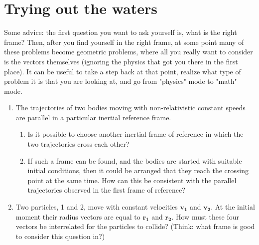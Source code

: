\documentclass{article}
\begin{document}
\section{Trying out the waters}
Some advice: the first question you want to ask yourself is, what is the right frame? Then, after you find yourself in the right frame, at some point many of these problems become geometric problems, where all you really want to consider is the vectors themselves (ignoring the physics that got you there in the first place). It can be useful to take a step back at that point, realize what type of problem it is that you are looking at, and go from "physics" mode to "math" mode. 
\begin{enumerate}

    \item The trajectories of two bodies moving with non-relativistic constant speeds are parallel in a particular inertial reference frame.
\begin{enumerate}
    \item Is it possible to choose another inertial frame of reference in which the two trajectories cross each other?
    \item If such a frame can be found, and the bodies are started with suitable initial conditions, then it could be arranged that they reach the crossing point at the same time. How can this be consistent with the parallel trajectories observed in the first frame of reference?
\end{enumerate}

    \item Two particles, 1 and 2, move with constant velocities $\mathbf{v_1}$ and $\mathbf{v_2}$. At the initial moment their radius vectors are equal to $\mathbf{r_1}$ and $\mathbf{r_2}$. How must these four vectors be interrelated for the particles to collide? (Think: what frame is good to consider this question in?)


\end{enumerate}
\end{document}
